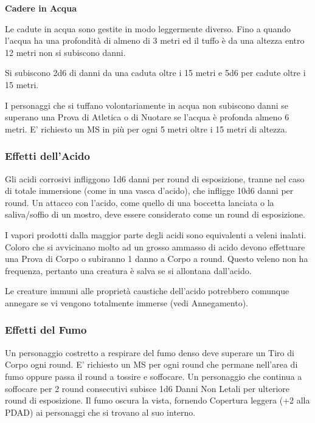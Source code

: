 \documentclass[12pt,a4paper,twoside,openany]{book}
\begin{document}
\begin{multicols}{2}
\medskip

\textbf{Cadere in Acqua}

Le cadute in acqua sono gestite in modo leggermente diverso. Fino a quando l'acqua ha una profondità di almeno di 3 metri ed il tuffo è da una altezza entro 12 metri non si subiscono danni.

Si subiscono 2d6 di danni da una caduta oltre i 15 metri e 5d6 per cadute oltre i 15 metri.

I personaggi che si tuffano volontariamente in acqua non subiscono danni se superano una Prova di Atletica o di Nuotare se l'acqua è profonda almeno 6 metri. E' richiesto un MS in più per ogni 5 metri oltre i 15 metri di altezza.

\subsubsection{Effetti dell'Acido}

\label{effetti-dellacido}

Gli acidi corrosivi infliggono 1d6 danni per round di esposizione, tranne nel caso di totale immersione (come in una vasca d'acido), che infligge 10d6 danni per round. Un attacco con l'acido, come quello di una boccetta lanciata o la saliva/soffio di un mostro, deve essere considerato come un round di esposizione.

I vapori prodotti dalla maggior parte degli acidi sono equivalenti a veleni inalati. Coloro che si avvicinano molto ad un grosso ammasso di acido devono effettuare una Prova di Corpo o subiranno 1 danno a Corpo a round. Questo veleno non ha frequenza, pertanto una creatura è salva se si allontana dall'acido.

Le creature immuni alle proprietà caustiche dell'acido potrebbero comunque annegare se vi vengono totalmente immerse (vedi Annegamento).

\subsubsection{Effetti del Fumo}

\label{effetti-del-fumo}

Un personaggio costretto a respirare del fumo denso deve superare un Tiro di Corpo ogni round. E' richiesto un MS per ogni round che permane nell'area di fumo oppure passa il round a tossire e soffocare. Un personaggio che continua a soffocare per 2 round consecutivi subisce 1d6 Danni Non Letali per ulteriore round di esposizione. Il fumo oscura la vista, fornendo Copertura leggera (+2 alla PDAD) ai personaggi che si trovano al suo interno.


\end{multicols}
\end{document}
